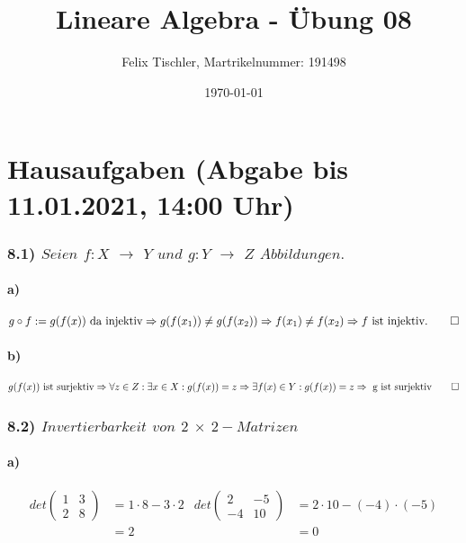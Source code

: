 \documentclass[titlepage]{article}
\newcommand{\1}{\mathbb{1}}
\newcommand{\0}{\mathbb{0}}
\begin{document}
	
	\title{Lineare Algebra - Übung 08}
	\author{Felix Tischler, Martrikelnummer: 191498}
	\date{\today}
	\maketitle
	
	\part*{Hausaufgaben (Abgabe bis 11.01.2021, 14:00 Uhr)}
	\section*{8.1) $Seien$ $f : X$ $\rightarrow$ $Y$ $und$ $g : Y$ $\rightarrow$ $Z$ $Abbildungen.$}
		\subsection*{a)}
			\begin{align*}
				g\circ f:=g(f(x))\text{ da injektiv}\Rightarrow g(f(x_1))\neq g(f(x_2))\Rightarrow f(x_1)\neq f(x_2)\Rightarrow f\text{ ist injektiv.}\qed
			\end{align*}
		\subsection*{b)}
			\begin{align*}
				g(f(x))\text{ ist surjektiv}\Rightarrow\forall z\in Z:\exists x\in X:g(f(x))=z\Rightarrow\exists f(x)\in Y:g(f(x))=z\Rightarrow\text{ g ist surjektiv}\qed
			\end{align*}
	\section*{8.2) $Invertierbarkeit$ $von$ $2$ $\times$ $2-Matrizen$}
		\subsection*{a)}
			\begin{align*}
				det\begin{pmatrix}1&3\\2&8\end{pmatrix}&=1\cdot8-3\cdot2 &det\begin{pmatrix}2&-5\\-4&10\end{pmatrix}&=2\cdot10-(-4)\cdot(-5)
				\\
				&=2 & &=0
			\end{align*}
\end{document}

